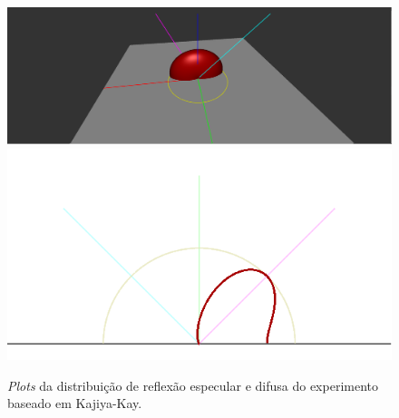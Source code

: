 \begin{figure}[H]
    \caption{\small{\textit{Plots} da distribuição de reflexão especular e difusa do experimento baseado em Kajiya-Kay.}}
    \label{fig-kajiya-plots}
    \vspace{42px}
  \includegraphics[width=\linewidth]{./Imagens/brdfs/aniso-3D-plot}
\endminipage\hfill
{}
  \includegraphics[width=\linewidth]{./Imagens/brdfs/aniso-polar-plot.png}
\endminipage\hfill
\end{figure}

